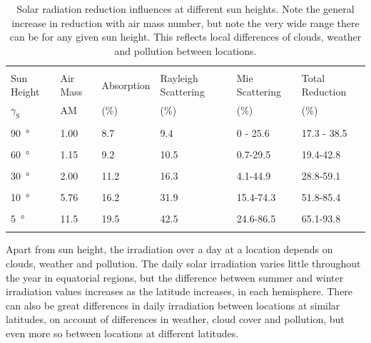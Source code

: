 \documentclass[class=scrartcl, crop=false,parskip=half,]{standalone}
\begin{document}
\begin{table}[ht] 
\caption{Solar radiation reduction influences at different sun heights. Note the general increase in reduction with air mass number, but note the very wide range there can be for any given sun height. This reflects local differences of clouds, weather and pollution between locations.}
\centering
    \begin{tabu}to 0.9\textwidth {  X[c]  X[c]  X[c] X[c] X[c] X[c] }
    \hline\\
    Sun Height  & Air Mass  & Absorption  & Rayleigh Scattering  & Mie Scattering  & Total Reduction\\  
    $\gamma_\text{S}$ & AM & (\%) & (\%) & (\%) & (\%)\\
    \hline\\
    \SI{90}{\degree} & 1.00 & 8.7 & 9.4 & 0 - 25.6 & 17.3 - 38.5 \\
     \hline\\
     \SI{60}{\degree} &1.15&9.2&10.5&0.7-29.5&19.4-42.8\\
    \hline\\
    \SI{30}{\degree} &2.00&11.2&16.3&4.1-44.9&28.8-59.1\\
     \hline\\
     \SI{10}{\degree} &5.76&16.2&31.9&15.4-74.3&51.8-85.4\\
    \hline\\
    \SI{5}{\degree} &11.5&19.5&42.5&24.6-86.5&65.1-93.8\\
    \hline\\
    \end{tabu}
\label{tab:SolarReductionEffects}
\end{table}

Apart from sun height, the irradiation over a day at a location depends on clouds, weather and pollution. The daily solar irradiation varies little throughout the year in equatorial regions, but the difference between summer and winter irradiation values increases as the latitude increases, in each hemisphere. There can also be great differences in daily irradiation between locations at similar latitudes, on account of differences in weather, cloud cover and pollution, but even more so between locations at different latitudes.
\end{document}
